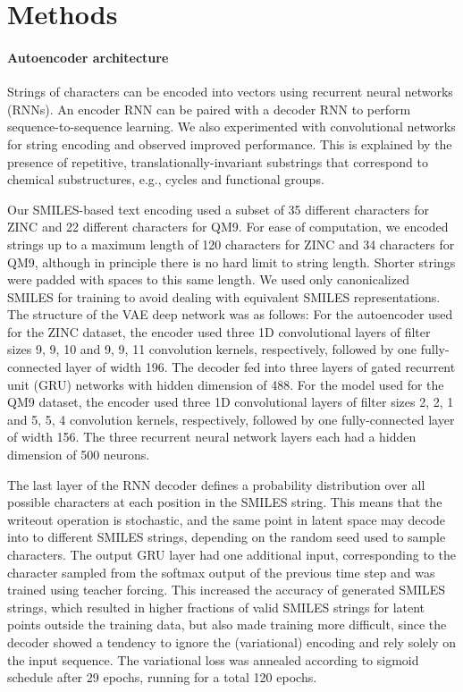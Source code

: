 \documentclass[journal=acscii,manuscript=article]{achemso}
\begin{document}
\section*{Methods}

\paragraph{Autoencoder architecture}
Strings of characters can be encoded into vectors using recurrent neural networks (RNNs). 
An encoder RNN can be paired with a decoder RNN to perform sequence-to-sequence learning.\cite{sutskever2014sequence}
We also experimented with convolutional networks for string encoding\cite{KalchbrennerACL2014} and observed improved performance.
This is explained by the presence of repetitive, translationally-invariant substrings that correspond to chemical substructures, e.g., cycles and functional groups.

Our SMILES-based text encoding used a subset of 35 different characters for ZINC and 22 different characters for QM9.
For ease of computation, we encoded strings up to a maximum length of 120 characters for ZINC and 34 characters for QM9, although in principle there is no hard limit to string length. Shorter strings were padded with spaces to this same length. We used only canonicalized SMILES for training to avoid dealing with equivalent SMILES representations.
The structure of the VAE deep network was as follows: For the autoencoder used for the ZINC dataset, the encoder used three 1D convolutional layers of filter sizes 9, 9, 10 and 9, 9, 11 convolution kernels, respectively, followed by one fully-connected layer of width 196. The decoder fed into three layers of gated recurrent unit (GRU) networks\cite{chung_2014_empirical} with hidden dimension of 488. %
For the model used for the QM9 dataset, the encoder used three 1D convolutional layers of filter sizes 2, 2, 1 and 5, 5, 4 convolution kernels, respectively, followed by one fully-connected layer of width 156. The three recurrent neural network layers each had a hidden dimension of 500 neurons.

The last layer of the RNN decoder defines a probability distribution over all possible characters at each position in the SMILES string.
This means that the writeout operation is stochastic, and the same point in latent space may decode into to different SMILES strings, depending on the random seed used to sample characters.
The output GRU layer had one additional input, corresponding to the character sampled from the softmax output of the previous time step and was trained using teacher forcing.\cite{williams_1989} This increased the accuracy of generated SMILES strings, which resulted in higher fractions of valid SMILES strings for latent points outside the training data, but also made training more difficult, since the decoder showed a tendency to ignore the (variational) encoding and rely solely on the input sequence. The variational loss was annealed according to sigmoid schedule after 29 epochs, running for a total 120 epochs.
\end{document}
